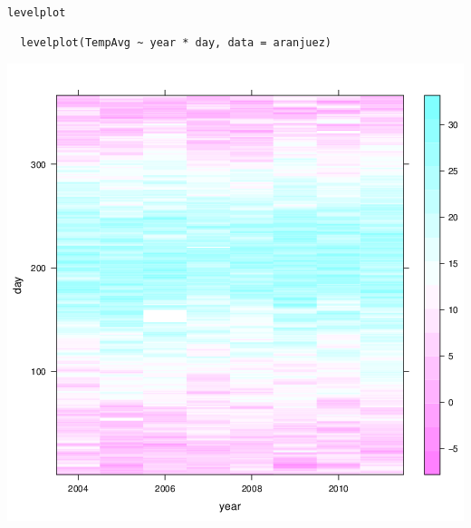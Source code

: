 \documentclass[xcolor={usenames,svgnames,dvipsnames}]{beamer}
\begin{document}
\begin{frame}[fragile,label={sec:orgheadline41}]{\texttt{levelplot}}
 \lstset{language=R,label= ,caption= ,captionpos=b,numbers=none}
\begin{lstlisting}
  levelplot(TempAvg ~ year * day, data = aranjuez)
\end{lstlisting}
\end{frame}

\begin{frame}[label={sec:orgheadline42}]{}
\includegraphics[width=.9\linewidth]{figs/levelplot.png}
\end{frame}
\end{document}
